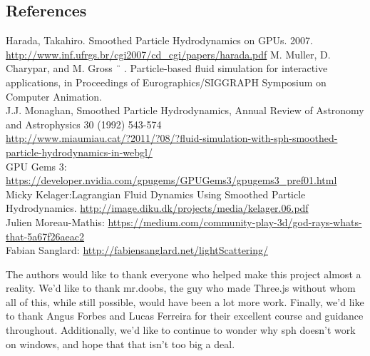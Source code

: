 \subsection{References}
Harada, Takahiro. Smoothed Particle Hydrodynamics on GPUs. 2007. \url{http://www.inf.ufrgs.br/cgi2007/cd_cgi/papers/harada.pdf}
M. Muller, D. Charypar, and M. Gross ¨ . Particle-based fluid simulation
for interactive applications, in Proceedings of Eurographics/SIGGRAPH
Symposium on Computer Animation. \\
J.J. Monaghan, Smoothed Particle Hydrodynamics, Annual Review of Astronomy and Astrophysics
30 (1992) 543-574 \\
\url{http://www.miaumiau.cat/?2011/?08/?fluid-simulation-with-sph-smoothed-particle-hydrodynamics-in-webgl/} \\
GPU Gems 3: \url{https://developer.nvidia.com/gpugems/GPUGems3/gpugems3_pref01.html} \\
Micky Kelager:Lagrangian Fluid Dynamics
Using Smoothed Particle Hydrodynamics. \url{http://image.diku.dk/projects/media/kelager.06.pdf} \\
Julien Moreau-Mathis: \url{https://medium.com/community-play-3d/god-rays-whats-that-5a67f26aeac2} \\
Fabian Sanglard: \url{http://fabiensanglard.net/lightScattering/}
\begin{acks}
 The authors would like to thank everyone who helped make this project almost a reality.
We'd like to thank mr.doobs, the guy who made Three.js without whom all of this, while still possible,
would have been a lot more work. Finally, we'd like to thank Angus Forbes and Lucas Ferreira for their
excellent course and guidance throughout. Additionally, we'd like to continue to wonder why sph doesn't work on windows, and hope that that isn't too big a deal.

\end{acks}
